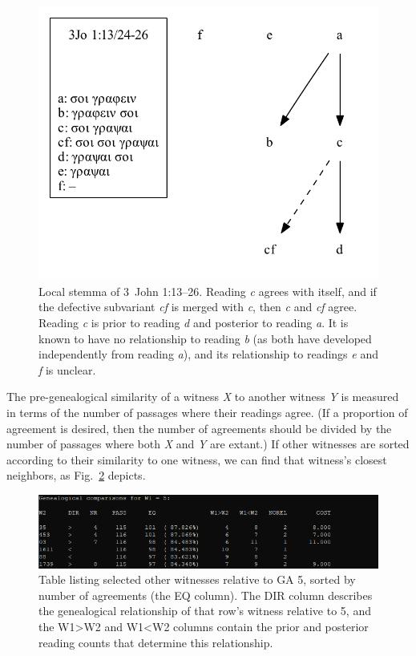 \documentclass[a4paper, 12pt]{article}
\begin{document}
	\begin{figure}[h!]
		\centering
		\includegraphics[scale=0.6666]{../graphics/B25K1V13U24-26-local-stemma.pdf}
		\caption{Local stemma of 3~John 1:13–26. Reading \emph{c} agrees with itself, and if the defective subvariant \emph{cf} is merged with \emph{c}, then \emph{c} and \emph{cf} agree. Reading \emph{c} is prior to reading \emph{d} and posterior to reading \emph{a}. It is known to have no relationship to reading \emph{b} (as both have developed independently from reading \emph{a}), and its relationship to readings \emph{e} and \emph{f} is unclear.}
		\label{fig:genealogical-relationships}
	\end{figure}
	
	\newpage
	
	The pre-genealogical similarity of a witness \emph{X} to another witness \emph{Y} is measured in terms of the number of passages where their readings agree. (If a proportion of agreement is desired, then the number of agreements should be divided by the number of passages where both \emph{X} and \emph{Y} are extant.) If other witnesses are sorted according to their similarity to one witness, we can find that witness's closest neighbors, as Fig.~\ref{fig:compare-witnesses} depicts.
	
	\begin{figure}[h!]
		\centering
		\includegraphics[width=\textwidth]{../graphics/compare-witnesses.png}
		\caption{Table listing selected other witnesses relative to GA 5, sorted by number of agreements (the \textsf{EQ} column). The \textsf{DIR} column describes the genealogical relationship of that row's witness relative to 5, and the \textsf{W1>W2} and \textsf{W1<W2} columns contain the prior and posterior reading counts that determine this relationship.}
		\label{fig:compare-witnesses}
	\end{figure}
	
\end{document}
